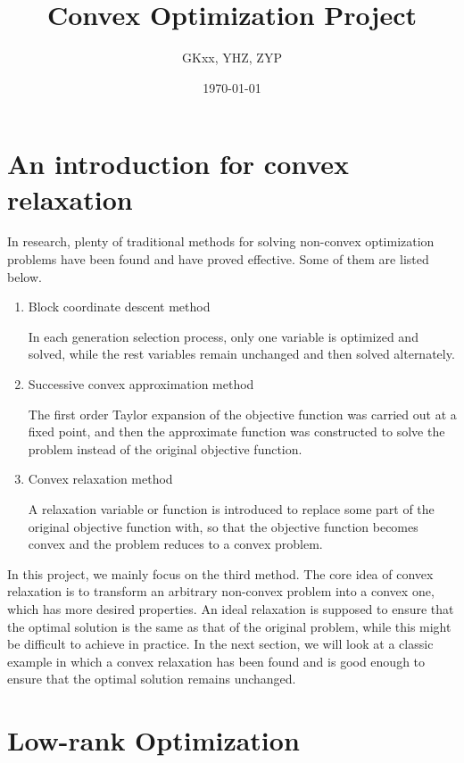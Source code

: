 \documentclass[11pt]{article}
\title{Convex Optimization Project}
\author{GKxx, YHZ, ZYP}
\date{\today}
\begin{document}
\maketitle

\tableofcontents

\newpage

\section{An introduction for convex relaxation}

In research, plenty of traditional methods for solving non-convex optimization problems have been found and have proved effective. Some of them are listed below.

\begin{enumerate}
    \item Block coordinate descent method\par
    In each generation selection process, only one variable is optimized and solved, while the rest variables remain unchanged and then solved alternately.
    \item Successive convex approximation method\par
    The first order Taylor expansion of the objective function was carried out at a fixed point, and then the approximate function was constructed to solve the problem instead of the original objective function.
    \item Convex relaxation method\par
    A relaxation variable or function is introduced to replace some part of the original objective function with, so that the objective function becomes convex and the problem reduces to a convex problem.
\end{enumerate}

In this project, we mainly focus on the third method. The core idea of convex relaxation is to transform an arbitrary non-convex problem into a convex one, which has more desired properties. An ideal relaxation is supposed to ensure that the optimal solution is the same as that of the original problem, while this might be difficult to achieve in practice. In the next section, we will look at a classic example in which a convex relaxation has been found and is good enough to ensure that the optimal solution remains unchanged.

\section{Low-rank Optimization}
\end{document}
